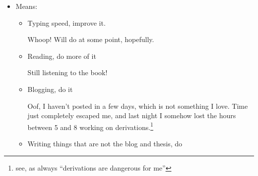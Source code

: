 \documentclass[12pt]{article}
\newcommand{\say}[1]{``#1''}
\renewcommand{\,}{\textsuperscript{,}}
\begin{document}
\begin{itemize}
\begin{itemize}
\begin{itemize}
The pen I'm using right now is a little high flowing, which is maybe not the best.  
I do love the way that the wet ink looks on the page.

\item Handwriting, pick and make the new one

I tried something to the extreme of print, with incredibly sharp lines.  
I realized how much I hate it, and have been doing some cursive now as I take notes.  
I remembered or was reminded\footnote{memory is strange} that cursive comes from running, and it is so nice just sliding my pen.  
Might just give up on the part of me that prefers print and commit to making more people learn cursive.

\end{itemize}

\item Means:

\begin{itemize}

\item Typing speed, improve it.

Whoop! Will do at some point, hopefully.

\item Reading, do more of it

Still listening to the book!

\item Blogging, do it

Oof, I haven't posted in a few days, which is not something I love.  
Time just completely escaped me, and last night I somehow lost the hours between 5 and 8 working on derivations.\footnote{see, as always \say{derivations are dangerous for me}}

\item Writing things that are not the blog and thesis, do

\end{itemize}

\end{itemize}

\end{itemize}
\end{document}
